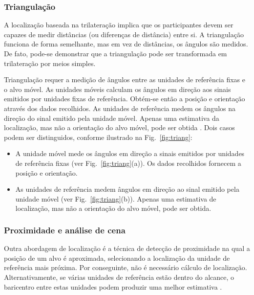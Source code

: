 \subsubsection{Triangulação}\label{sec:triang}


A localização baseada na trilateração implica que os participantes devem ser capazes de medir distâncias (ou diferenças de distância) entre si. A triangulação funciona de forma semelhante, mas em vez de distâncias, os ângulos são medidos. De fato, pode-se demonstrar que a triangulação pode ser transformada em trilateração por meios simples\cite{linde2006aspects}. 

Triangulação requer a medição de ângulos entre as unidades de referência fixas e o alvo móvel. As unidades móveis calculam os ângulos em direção aos sinais emitidos por unidades fixas de referência. Obtém-se então a posição e orientação através dos dados recolhidos. As unidades de referência medem os ângulos na direção do sinal emitido pela unidade móvel. Apenas uma estimativa da localização, mas não a orientação do alvo móvel, pode ser obtida \cite{lutzke2013experimental}. Dois casos podem ser distinguidos, conforme ilustrado na Fig.~\ref{fig:triang}:


\begin{itemize}
  \item A unidade móvel mede os ângulos em direção a sinais emitidos por unidades de referência fixas (ver Fig.~\ref{fig:triang}(a)). Os dados recolhidos fornecem a posição e orientação.
  \item As unidades de referência medem ângulos em direção ao sinal emitido pela unidade móvel (ver Fig.~\ref{fig:triang}(b)). Apenas uma estimativa de localização, mas não a orientação do alvo móvel, pode ser obtida.
 \end{itemize}


\subsubsection{Proximidade e análise de cena}\label{sec:proximidade}
Outra abordagem de localização é a técnica de detecção de proximidade na qual a posição de um alvo é aproximada, selecionando a localização da unidade de referência mais próxima. Por conseguinte, não é necessário cálculo de localização. Alternativamente, se várias unidades de referência estão dentro do alcance, o baricentro entre estas unidades podem produzir uma melhor estimativa \cite{EHuber1996}.


